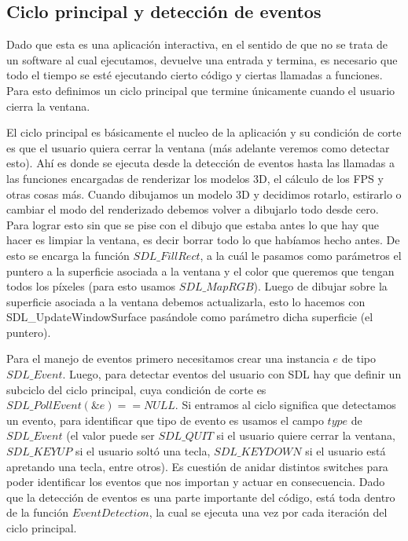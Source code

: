 \documentclass[a4paper]{article}
\newcounter{col}
\begin{document}
\subsection{Ciclo principal y detección de eventos}
Dado que esta es una aplicación interactiva, en el sentido de que no se trata de un software al cual ejecutamos, devuelve una entrada y termina, es necesario que todo el tiempo se esté ejecutando cierto código y ciertas llamadas a funciones. Para esto definimos un ciclo principal que termine únicamente cuando el usuario cierra la ventana. \par El ciclo principal es básicamente el nucleo de la aplicación y su condición de corte es que el usuario quiera cerrar la ventana (más adelante veremos como detectar esto). Ahí es donde se ejecuta desde la detección de eventos hasta las llamadas a las funciones encargadas de renderizar los modelos 3D, el cálculo de los FPS y otras cosas más. Cuando dibujamos un modelo 3D y decidimos rotarlo, estirarlo o cambiar el modo del renderizado debemos volver a dibujarlo todo desde cero. Para lograr esto sin que se pise con el dibujo que estaba antes lo que hay que hacer es limpiar la ventana, es decir borrar todo lo que habíamos hecho antes. De esto se encarga la función $SDL\_FillRect$, a la cuál le pasamos como parámetros el puntero a la superficie asociada a la ventana y el color que queremos que tengan todos los píxeles (para esto usamos $SDL\_MapRGB$). Luego de dibujar sobre la superficie asociada a la ventana debemos actualizarla, esto lo hacemos con SDL_UpdateWindowSurface pasándole como parámetro dicha superficie (el puntero).
\par Para el manejo de eventos primero necesitamos crear una instancia $e$ de tipo $SDL\_Event$. Luego, para detectar eventos del usuario con SDL hay que definir un subciclo del ciclo principal, cuya condición de corte es $SDL\_PollEvent(\&e) == NULL$. Si entramos al ciclo significa que detectamos un evento, para identificar que tipo de evento es usamos el campo $type$ de $SDL\_Event$ (el valor puede ser $SDL\_QUIT$ si el usuario quiere cerrar la ventana, $SDL\_KEYUP$ si el usuario soltó una tecla, $SDL\_KEYDOWN$ si el usuario está apretando una tecla, entre otros). Es cuestión de anidar distintos switches para poder identificar los eventos que nos importan y actuar en consecuencia. Dado que la detección de eventos es una parte importante del código, está toda dentro de la función $EventDetection$, la cual se ejecuta una vez por cada iteración del ciclo principal.
\end{document}
